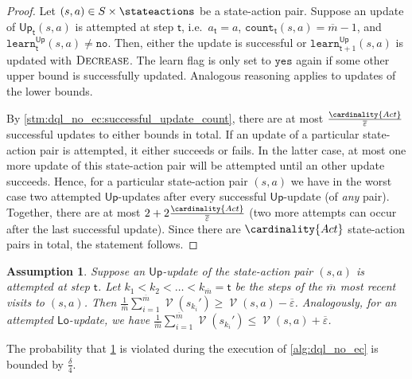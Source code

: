 \documentclass{theoretics}
\newcommand{\States}{S}
\newcommand{\Actions}{Act}
\DeclareMathOperator{\val}{\mathcal{V}}
\newcommand{\upperbound}{\mathsf{Up}}
\newcommand{\lowerbound}{\mathsf{Lo}}
\newcommand{\updatestep}{{\overline{\varepsilon}}}
\newcommand{\delay}{{\overline{m}}}
\newcommand{\visitcount}{\texttt{count}}
\newcommand{\learn}{\texttt{learn}}
\newcommand{\learnyes}{\texttt{yes}}
\newcommand{\learnno}{\texttt{no}}
\newcommand{\learndecrease}{\textsc{Decrease}}
\newcommand{\algostep}{\mathsf{t}}
\newtheorem{assumption}{Assumption}
\begin{document}
\begin{proof}
	Let $(s, a) \in \States \times \stateactions$ be a state-action pair.
	Suppose an update of $\upperbound_\algostep(s, a)$ is attempted at step $\algostep$, i.e.\ $a_\algostep = a$, $\visitcount_\algostep(s, a) = \delay - 1$, and $\learn_\algostep^\upperbound(s, a) \neq \learnno$.
	Then, either the update is successful or $\learn^\upperbound_{\algostep + 1}(s, a)$ is updated with $\learndecrease$.
	The learn flag is only set to $\learnyes$ again if some other upper bound is successfully updated.
	Analogous reasoning applies to updates of the lower bounds.

	By \cref{stm:dql_no_ec:successful_update_count}, there are at most $\frac{\cardinality{\Actions}}{\updatestep}$ successful updates to either bounds in total.
	If an update of a particular state-action pair is attempted, it either succeeds or fails.
	In the latter case, at most one more update of this state-action pair will be attempted until an other update succeeds.
	Hence, for a particular state-action pair $(s, a)$ we have in the worst case two attempted $\upperbound$-updates after every successful $\upperbound$-update (of \emph{any} pair).
	Together, there are at most $2 + 2 \frac{\cardinality{\Actions}}{\updatestep}$ (two more attempts can occur after the last successful update).
	Since there are $\cardinality{\Actions}$ state-action pairs in total, the statement follows. 
\end{proof}
\begin{assumption} \label{asm:dql_no_ec:sampled_value_close_to_real_value}
	Suppose an $\upperbound$-update of the state-action pair $(s, a)$ is attempted at step $\algostep$.
	Let $k_1 < k_2 < \ldots < k_\delay = \algostep$ be the steps of the $\delay$ most recent visits to $(s, a)$.
	Then $\frac{1}{\delay} \sum_{i=1}^\delay \val(s_{k_i}') \geq \val(s, a) - \updatestep$.
	Analogously, for an attempted $\lowerbound$-update, we have $\frac{1}{\delay} \sum_{i=1}^\delay \val(s_{k_i}') \leq \val(s, a) + \updatestep$. 
\end{assumption}

\begin{lemma} \label{stm:dql_no_ec:sampled_value_close_to_real_value_probability}
	The probability that \cref{asm:dql_no_ec:sampled_value_close_to_real_value} is violated during the execution of \cref{alg:dql_no_ec} is bounded by $\frac{\delta}{4}$. 
\end{lemma}
\end{document}
